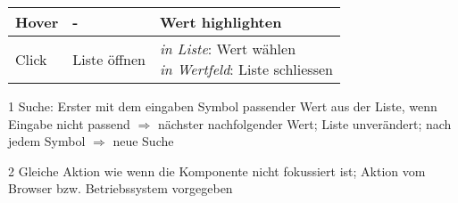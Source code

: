 \begin{table}[!htb]
\begin{adjustbox}{max width=\textwidth}
\begin{threeparttable}
\begin{tabular}{ l || l | l }
                \hline
                Hover      & -                & Wert highlighten \\
                \hline
                Click      & Liste öffnen     & \tbbr{\emph{in Liste}: Wert wählen \\
                                                    \emph{in Wertfeld}: Liste schliessen} \\
                \hline
            \end{tabular}
            \begin{tablenotes}
                \scriptsize
                \item[1] Suche: Erster mit dem eingaben Symbol passender Wert aus der Liste, wenn Eingabe nicht passend $\Rightarrow$ nächster nachfolgender Wert; 
                                Liste unverändert; nach jedem Symbol $\Rightarrow$ neue Suche
                \item[2] Gleiche Aktion wie wenn die Komponente nicht fokussiert ist; Aktion vom Browser bzw. Betriebssystem vorgegeben
            \end{tablenotes}
        \end{threeparttable}
    \end{adjustbox}
\end{table}

